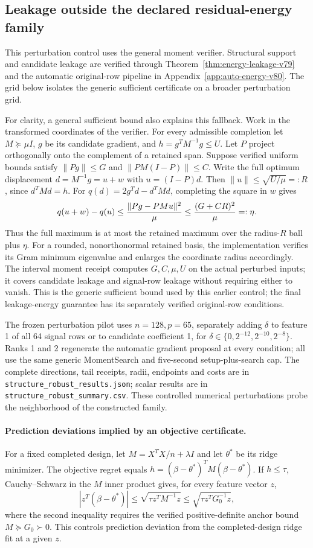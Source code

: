 \subsection{Leakage outside the declared residual-energy family}
This perturbation control uses the general moment verifier. Structural support and candidate leakage are verified through Theorem~\ref{thm:energy-leakage-v79} and the automatic original-row pipeline in Appendix~\ref{app:auto-energy-v80}. The grid below isolates the generic sufficient certificate on a broader perturbation grid.

For clarity, a general sufficient bound also explains this fallback. Work in the transformed coordinates of the verifier. For every admissible completion let $M\succeq\mu I$, $g$ be its candidate gradient, and $h=g^TM^{-1}g\le U$. Let $P$ project orthogonally onto the complement of a retained span. Suppose verified uniform bounds satisfy $\|Pg\|\le G$ and $\|PM(I-P)\|\le C$. Write the full optimum displacement $d=M^{-1}g=u+w$ with $u=(I-P)d$. Then $\|u\|\le\sqrt{U/\mu}=:R$, since $d^TMd=h$. For $q(d)=2g^Td-d^TMd$, completing the square in $w$ gives
\[
q(u+w)-q(u)\le {\|Pg-PMu\|^2\over\mu}
 \le {(G+CR)^2\over\mu}=:\eta.
\]
Thus the full maximum is at most the retained maximum over the radius-$R$ ball plus $\eta$. For a rounded, nonorthonormal retained basis, the implementation verifies its Gram minimum eigenvalue and enlarges the coordinate radius accordingly. The interval moment receipt computes $G,C,\mu,U$ on the actual perturbed inputs; it covers candidate leakage and signal-row leakage without requiring either to vanish. This is the generic sufficient bound used by this earlier control; the final leakage-energy guarantee has its separately verified original-row conditions.

The frozen perturbation pilot uses $n=128,p=65$, separately adding $\delta$ to feature 1 of all 64 signal rows or to candidate coefficient 1, for $\delta\in\{0,2^{-12},2^{-10},2^{-8}\}$. Ranks 1 and 2 regenerate the automatic gradient proposal at every condition; all use the same generic MomentSearch and five-second setup-plus-search cap. The complete directions, tail receipts, radii, endpoints and costs are in \texttt{structure\_robust\_results.json}; scalar results are in \texttt{structure\_robust\_summary.csv}. These controlled numerical perturbations probe the neighborhood of the constructed family.

\paragraph{Prediction deviations implied by an objective certificate.}
For a fixed completed design, let $M=X^TX/n+\lambda I$ and let $\theta^*$ be its ridge minimizer. The objective regret equals
$h=(\beta-\theta^*)^TM(\beta-\theta^*)$.
If $h\le\tau$, Cauchy--Schwarz in the $M$ inner product gives, for every feature vector $z$,
\[
|z^T(\beta-\theta^*)|\le\sqrt{\tau z^TM^{-1}z}
\le\sqrt{\tau z^TG_0^{-1}z},
\]
where the second inequality requires the verified positive-definite anchor bound $M\succeq G_0\succ0$. This controls prediction deviation from the completed-design ridge fit at a given $z$.
